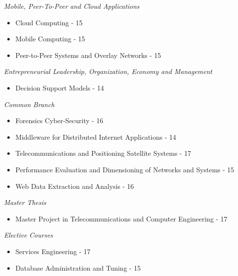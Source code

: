 \textit{Mobile, Peer-To-Peer and Cloud Applications}
	\begin{itemize}
		\item Cloud Computing - 15
		\item Mobile Computing - 15
		\item Peer-to-Peer Systems and Overlay Networks - 15
	\end{itemize}
\textit{Entrepreneurial Leadership, Organization, Economy and Management}
	\begin{itemize}
		\item Decision Support Models - 14
	\end{itemize}
\textit{Common Branch}
	\begin{itemize}
		\item Forensics Cyber-Security - 16
		\item Middleware for Distributed Internet Applications - 14
		\item Telecommunications and Positioning Satellite Systems - 17
		\item Performance Evaluation and Dimensioning of Networks and Systems - 15
		\item Web Data Extraction and Analysis - 16
	\end{itemize}
\textit{Master Thesis}
	\begin{itemize}
		\item Master Project in Telecommunications and Computer Engineering - 17
	\end{itemize}

\textit{Elective Courses}
	\begin{itemize}
		\item Services Engineering - 17
		\item Database Administration and Tuning - 15
	\end{itemize}